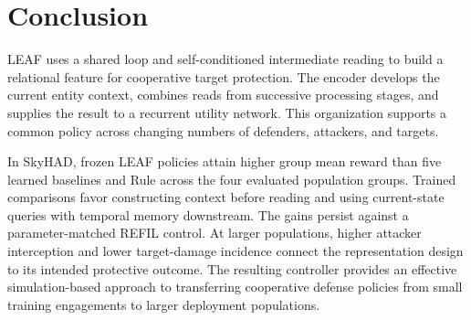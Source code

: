 \section{Conclusion}
LEAF uses a shared loop and self-conditioned intermediate reading to build a relational feature for cooperative target protection. The encoder develops the current entity context, combines reads from successive processing stages, and supplies the result to a recurrent utility network. This organization supports a common policy across changing numbers of defenders, attackers, and targets.

In SkyHAD, frozen LEAF policies attain higher group mean reward than five learned baselines and Rule across the four evaluated population groups. Trained comparisons favor constructing context before reading and using current-state queries with temporal memory downstream. The gains persist against a parameter-matched REFIL control. At larger populations, higher attacker interception and lower target-damage incidence connect the representation design to its intended protective outcome. The resulting controller provides an effective simulation-based approach to transferring cooperative defense policies from small training engagements to larger deployment populations.
